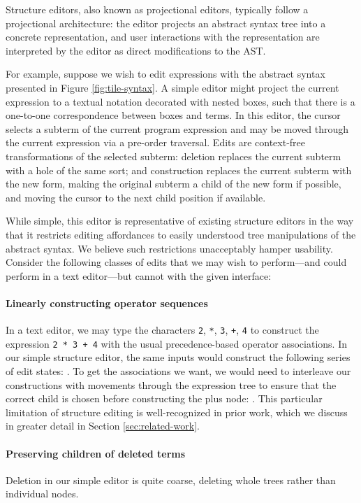 Structure editors, also known as projectional editors, typically
follow a projectional architecture: the editor projects an
abstract syntax tree into a concrete representation,
and user interactions with the representation are interpreted
by the editor as direct modifications to the AST.

For example, suppose we wish to edit expressions with the abstract
syntax presented in Figure \ref{fig:tile-syntax}.
A simple editor might project the current expression
to a textual notation decorated with nested boxes, such
that there is a one-to-one correspondence between
boxes and terms. 
In this editor, the cursor selects a subterm of the
current program expression and may be moved through
the current expression via a pre-order traversal.
Edits are context-free transformations
of the selected subterm:
  deletion replaces the current subterm with
    a hole of the same sort; and
  construction replaces the current subterm
    with the new form, making the original subterm
    a child of the new form if possible, and moving
    the cursor to the next child position if available.

While simple, this editor is representative of existing structure
editors in the way that it restricts editing affordances to easily
understood tree manipulations of the abstract syntax.
We believe such restrictions unacceptably hamper usability.
Consider the following classes of edits that we may wish to
perform---and could perform in a text editor---but cannot with the
given interface:

\paragraph{Linearly constructing operator sequences}
In a text editor, we may type the characters \texttt{2}, \texttt{*},
\texttt{3}, \texttt{+}, \texttt{4}
to construct the expression \texttt{2 * 3 + 4} with
the usual precedence-based operator associations.
In our simple structure editor, the same inputs would construct
the following series of edit states: .
To get the associations we want, we would need to interleave
our constructions with movements through the expression tree
to ensure that the correct child is chosen before constructing
the plus node: .
This particular limitation of structure editing is well-recognized
in prior work, which we discuss in greater detail in Section
\ref{sec:related-work}.

\paragraph{Preserving children of deleted terms}
Deletion in our simple editor is quite coarse, deleting whole
trees rather than individual nodes.



